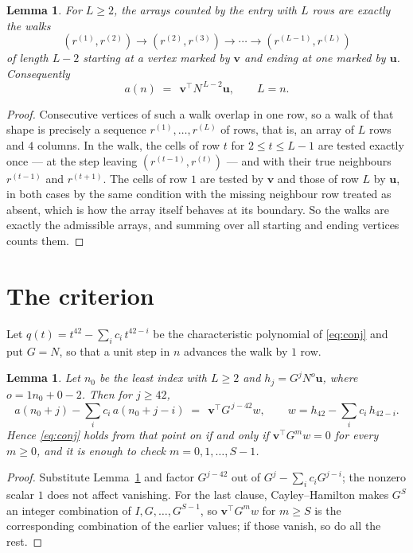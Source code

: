 \documentclass[11pt,a4paper]{article}
\theoremstyle{plain}
\newtheorem{lemma}[theorem]{Lemma}
\theoremstyle{definition}
\begin{document}
\begin{lemma}\label{lem:walk}
For $L\ge2$, the arrays counted by the entry with $L$ rows are exactly the walks
\[
(r^{(1)},r^{(2)})\to(r^{(2)},r^{(3)})\to\cdots\to(r^{(L-1)},r^{(L)})
\]
of length $L-2$ starting at a vertex marked by $\mathbf{v}$ and ending at one marked by
$\mathbf{u}$. Consequently
\[
a(n)\;=\;\,\mathbf{v}^{\!\top}N^{\,L-2}\mathbf{u},\qquad L=n .
\]
\end{lemma}

\begin{proof}
Consecutive vertices of such a walk overlap in one row, so a walk of that shape is
precisely a sequence $r^{(1)},\dots,r^{(L)}$ of rows, that is, an array of $L$ rows
and $4$ columns. In the walk, the cells of row $t$ for $2\le t\le L-1$ are tested
exactly once --- at the step leaving $(r^{(t-1)},r^{(t)})$ --- and with their true
neighbours $r^{(t-1)}$ and $r^{(t+1)}$. The cells of row $1$ are tested by
$\mathbf{v}$ and those of row $L$ by $\mathbf{u}$, in both cases by the same condition
with the missing neighbour row treated as absent, which is how the array itself behaves at
its boundary. So the walks are exactly the admissible arrays, and summing over all starting
and ending vertices counts them.
\end{proof}

\section{The criterion}

Let $q(t)=t^{42}-\sum_i c_i\,t^{42-i}$ be the characteristic polynomial of
\eqref{eq:conj} and put $G=N$, so that a unit step in $n$ advances the walk by
$1$ row.

\begin{lemma}\label{lem:crit}
Let $n_0$ be the least index with $L\ge2$ and $h_j=G^{j}N^{o}\mathbf{u}$, where
$o=1n_0+0-2$. Then for $j\ge42$,
\[
a(n_0+j)-\sum_i c_i\,a(n_0+j-i)\;=\;\,\mathbf{v}^{\!\top}G^{\,j-42}w,
\qquad w=h_{42}-\sum_i c_i\,h_{42-i} .
\]
Hence \eqref{eq:conj} holds from that point on if and only if
$\mathbf{v}^{\!\top}G^{m}w=0$ for every $m\ge0$, and it is enough to check
$m=0,1,\dots,S-1$.
\end{lemma}

\begin{proof}
Substitute Lemma~\ref{lem:walk} and factor $G^{j-42}$ out of
$G^{j}-\sum_ic_iG^{j-i}$; the nonzero scalar $1$ does not affect
vanishing. For the last clause, Cayley--Hamilton makes $G^{S}$ an integer combination of
$I,G,\dots,G^{S-1}$, so $\mathbf{v}^{\!\top}G^{m}w$ for $m\ge S$ is the corresponding
combination of the earlier values; if those vanish, so do all the rest.
\end{proof}
\end{document}
